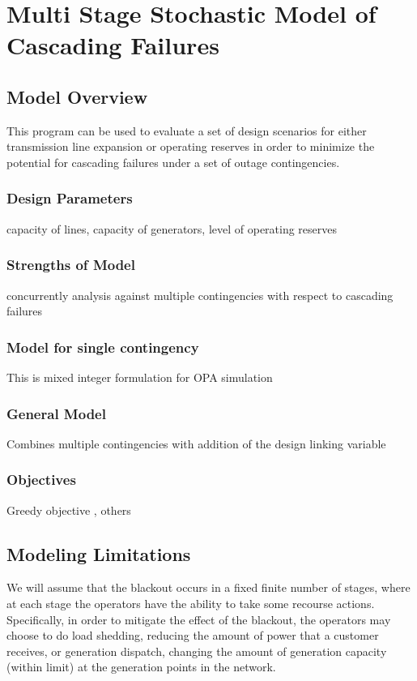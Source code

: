 
\chapter{Multi Stage Stochastic Model of Cascading Failures}

\section{Model Overview}
This program can be used to evaluate a set of design scenarios for either transmission line expansion or operating reserves in order to minimize the potential for cascading failures under a set of outage contingencies.
\subsection{Design Parameters}
capacity of lines, capacity of generators, level of operating reserves
\subsection{Strengths of Model}
concurrently analysis against multiple contingencies with respect to cascading failures

\subsection{Model for single contingency}
This is mixed integer formulation for OPA simulation

\subsection{General Model}
Combines multiple contingencies with addition of the design linking variable

\subsection{Objectives}
Greedy objective , others

\section{Modeling Limitations}

We will assume that the blackout occurs in a fixed finite number of
stages, where at each stage the operators have the ability to take
some recourse actions.  Specifically, in order to mitigate the effect
of the blackout, the operators may choose to do
load shedding, reducing the amount of power that a customer
receives, or  generation dispatch, changing the amount of
generation capacity (within limit) at the generation points in the
network. 


